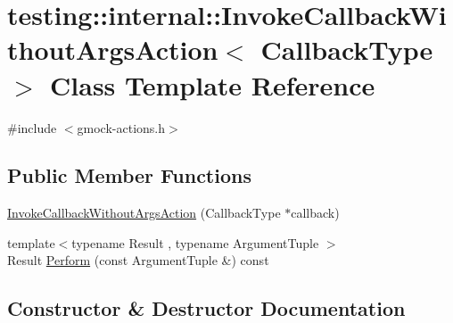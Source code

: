 \hypertarget{classtesting_1_1internal_1_1InvokeCallbackWithoutArgsAction}{}\section{testing\+::internal\+::Invoke\+Callback\+Without\+Args\+Action$<$ Callback\+Type $>$ Class Template Reference}
\label{classtesting_1_1internal_1_1InvokeCallbackWithoutArgsAction}


{\ttfamily \#include $<$gmock-\/actions.\+h$>$}

\subsection*{Public Member Functions}
\begin{DoxyCompactItemize}
\item 
\mbox{\hyperlink{classtesting_1_1internal_1_1InvokeCallbackWithoutArgsAction_a333d0b92596759753cf78dc98ee7e270}{Invoke\+Callback\+Without\+Args\+Action}} (Callback\+Type $\ast$callback)
\item 
{\footnotesize template$<$typename Result , typename Argument\+Tuple $>$ }\\Result \mbox{\hyperlink{classtesting_1_1internal_1_1InvokeCallbackWithoutArgsAction_ac43b186c6daa5f21c8377678c6a9d4ba}{Perform}} (const Argument\+Tuple \&) const
\end{DoxyCompactItemize}


\subsection{Constructor \& Destructor Documentation}
\mbox{\label{classtesting_1_1internal_1_1InvokeCallbackWithoutArgsAction_a333d0b92596759753cf78dc98ee7e270}} 
